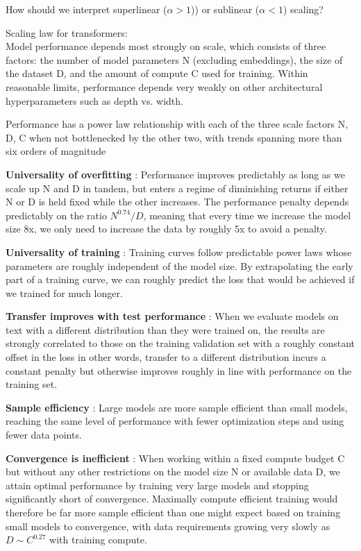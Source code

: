 \documentclass[12pt,a4paper]{article}
\begin{document}
How should we interpret superlinear ($\alpha >1$)) or sublinear ($\alpha<1$) scaling?

Scaling law for transformers:\\
Model performance depends most strongly on scale, which consists of three factors: the number of model parameters N (excluding embeddings), the size of the dataset D, and the amount of compute C used for training. Within reasonable limits, performance depends very weakly on other architectural hyperparameters such as depth vs. width.

Performance has a power law relationship with each of the three scale factors N, D, C when not bottlenecked by the other two, with trends spanning more than six orders of magnitude


\textbf{Universality of overfitting} : Performance improves predictably as long as we scale up N and D in
tandem, but enters a regime of diminishing returns if either N or D is held fixed while the other increases. The performance penalty depends predictably on the ratio $N^0.74/D$, meaning that every time we increase the model size 8x, we only need to increase the data by roughly 5x to avoid a penalty.

\textbf{Universality of training} : Training curves follow predictable power laws whose parameters are roughly independent of the model size. By extrapolating the early part of a training curve, we can roughly predict the loss that would be achieved if we trained for much longer.

\textbf{Transfer improves with test performance} : When we evaluate models on text with a different distribution than they were trained on, the results are strongly correlated to those on the training validation set with a roughly constant offset in the loss in other words, transfer to a different distribution incurs a constant penalty but otherwise improves roughly in line with performance on the training set.

\textbf{Sample efficiency} : Large models are more sample efficient than small models, reaching the same level of performance with fewer optimization steps and using fewer data points.

\textbf{Convergence is inefficient} : When working within a fixed compute budget C but without any other restrictions on the model size N or available data D, we attain optimal performance by training very large models and stopping significantly short of convergence. Maximally compute efficient training would therefore be far more sample efficient than one might expect based on training small models to convergence, with data requirements growing very slowly as $D\sim C^{0.27}$ with training compute.
\end{document}
